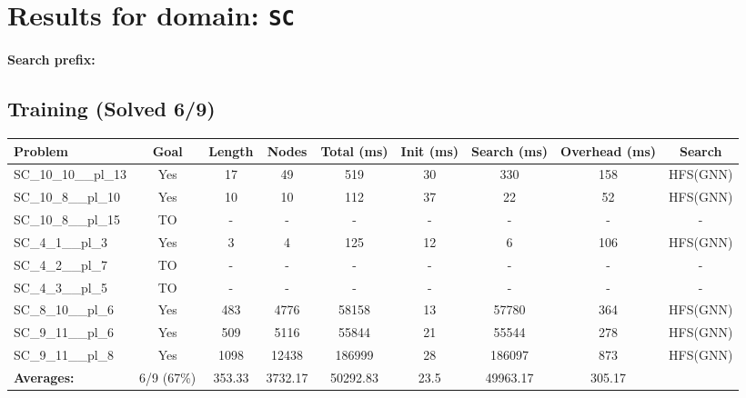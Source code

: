 \documentclass{article}
\begin{document}
\section*{Results for domain: \texttt{SC}}
\textbf{Search prefix:} 
\\[0.5cm]
\subsection*{Training (Solved 6/9)}
\begin{tabular}{lcccccccc}
\toprule
Problem & Goal & Length & Nodes & Total (ms) & Init (ms) & Search (ms) & Overhead (ms) & Search \\
\midrule
SC\_10\_10\_\_pl\_13 & Yes & 17 & 49 & 519 & 30 & 330 & 158 & HFS(GNN) \\
SC\_10\_8\_\_pl\_10 & Yes & 10 & 10 & 112 & 37 & 22 & 52 & HFS(GNN) \\
SC\_10\_8\_\_pl\_15 & TO & - & - & - & - & - & - & - \\
SC\_4\_1\_\_pl\_3 & Yes & 3 & 4 & 125 & 12 & 6 & 106 & HFS(GNN) \\
SC\_4\_2\_\_pl\_7 & TO & - & - & - & - & - & - & - \\
SC\_4\_3\_\_pl\_5 & TO & - & - & - & - & - & - & - \\
SC\_8\_10\_\_pl\_6 & Yes & 483 & 4776 & 58158 & 13 & 57780 & 364 & HFS(GNN) \\
SC\_9\_11\_\_pl\_6 & Yes & 509 & 5116 & 55844 & 21 & 55544 & 278 & HFS(GNN) \\
SC\_9\_11\_\_pl\_8 & Yes & 1098 & 12438 & 186999 & 28 & 186097 & 873 & HFS(GNN) \\
\textbf{Averages:} & 6/9 (67\%) & 353.33 & 3732.17 & 50292.83 & 23.5 & 49963.17 & 305.17 & \\
\bottomrule
\end{tabular}
\\[0.7cm]
\end{document}
